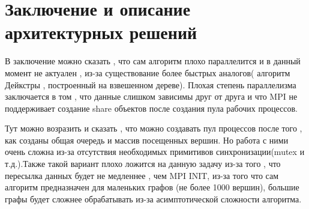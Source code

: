 \documentclass{report}
\begin{document}
\section*{Заключение и описание архитектурных решений}

\par В заключение можно сказать , что сам алгоритм плохо параллелится и в данный момент не
актуален , из-за существование более быстрых аналогов( алгоритм Дейкстры , построенный
на взвешенном дереве). Плохая степень параллелизма заключается в том , что данные
слишком зависимы друг от друга и что MPI не поддерживает создание share объектов после
создания пула рабочих процессов.
\par Тут можно возразить и сказать , что можно создавать пул процессов после того , как
созданы общая очередь и массив посещенных вершин. Но работа с ними очень сложна
из-за отсутствия необходимых примитивов синхронизации(mutex и т.д.).Также такой вариант
плохо ложится на данную задачу из-за того , что пересылка данных будет не медленнее ,
чем MPI INIT, из-за того что сам алгоритм предназначен для маленьких графов (не более
1000 вершин), большие графы будет сложнее обрабатывать из-за асимптотической
сложности алгоритма.
\end{document}
